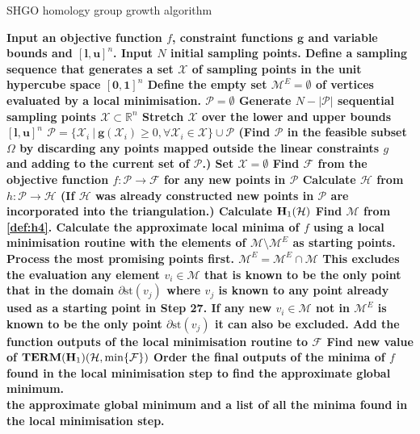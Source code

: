 \begin{algorithm} 
\caption{SHGO homology group growth algorithm}
\label{alg:shgo2}
\begin{algorithmic}[1]
\State \bf{Input} \normalfont an objective function $f$, constraint functions $\mathbf{g}$ and variable bounds and $[\mathbf{l}, \mathbf{u}]^n$.
\State \bf{Input} \normalfont $N$ initial sampling points.
\State Define a sampling sequence that generates a set $\mathcal{X}$ of sampling points in the unit hypercube space $[\mathbf{0}, \mathbf{1}]^n$
\State Define the empty set $\mathcal{M}^E = \emptyset$ of vertices evaluated by a local minimisation.
\EndProcedure
{}
\State $\mathcal{P} = \emptyset$
\State Generate $N - |\mathcal{P}|$ sequential sampling points $\mathcal{X} \subset \mathbb{R}^n$
\State Stretch $\mathcal{X}$ over the lower and upper bounds $[\mathbf{l}, \mathbf{u}]^n$
\State  $\mathcal{P} = \{\mathcal{X}_i ~|~ \mathbf{g}(\mathcal{X}_i)  \geq 0, \forall \mathcal{X}_i \in \mathcal{X}\} \cup\mathcal{P}$ 
\Comment (Find $\mathcal{P}$ in the feasible subset $\Omega$ by discarding any points mapped outside the linear constraints $g$ and adding to the current set of $\mathcal{P}$.)
\State Set $\mathcal{X} = \emptyset$
\EndWhile
\State Find $\mathcal{F}$ from the objective function $f: \mathcal{P} \rightarrow \mathcal{F}$ for any new points in $\mathcal{P}$
\EndProcedure
{}
\State Calculate $\mathcal{H}$ from $h: \mathcal{P}\rightarrow \mathcal{H}$  
\Comment (If $\mathcal{H}$ was already constructed new points in $\mathcal{P}$ are incorporated into the triangulation.)
\State Calculate $\bold{H}_1 (\mathcal{H})$
\EndProcedure
{}
\State Find $\mathcal{M}$ from \autoref{def:h4}.
\EndProcedure
{}
\State Calculate the approximate local minima of $f$ using a local minimisation routine with the elements of $\mathcal{M} \setminus \mathcal{M}^E$ as starting points. 
\Comment Process the most promising points first.
\State $\mathcal{M}^E = \mathcal{M}^E \cap \mathcal{M}$  \Comment This excludes the evaluation any element $ v_i \in \mathcal{M}$ that is known to be the only point that in the domain $\partial \textrm{st}(v_j)$ where $v_j$ is known to any point already used as a starting point in Step 27. If any new $ v_i \in \mathcal{M}$ not in $\mathcal{M}^E $ is known to be the only point $\partial \textrm{st}(v_j)$ it can also be excluded.
\State Add the function outputs of the local minimisation routine to $\mathcal{F}$
\EndProcedure
\State Find new value of $\mathbf{TERM}(\bold{H}_1) (\mathcal{H}, \min\{\mathcal{F}\})$
\EndWhile
{}
\State Order the final outputs of the minima of $f$ found in the local minimisation step to find the approximate global minimum.
\EndProcedure \\
\Return the approximate global minimum and a list of all the minima found in the local minimisation step.
\end{algorithmic}
\end{algorithm} 

